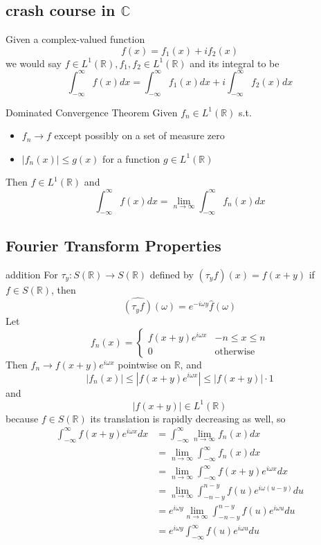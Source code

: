 \documentclass[a4paper]{article}
\newcommand{\C}{\mathbb{C}}
\newcommand{\R}{\mathbb{R}}
\begin{document}
\subsection{crash course in $\C$}

Given a complex-valued function \[
	f(x) = f_1(x) + i f_2(x)
\] we would say $f \in L^1(\R), f_1,f_2 \in L^1(\R)$ and its integral to be \[
\int_{-\infty}^{\infty} f(x) dx = \int_{-\infty}^{\infty} f_1(x)dx + i \int_{-\infty}^{\infty} f_2(x) dx
\] 

\begin{Theorem}{Dominated Convergence Theorem}{}
	Given $f_n \in L^1(\R)$ s.t. \begin{itemize}
		\item $f_n \to f$ except possibly on a set of measure zero
		\item $\left| f_n(x) \right| \le g(x) $ for a function $g \in L^1(\R)$
	\end{itemize}
	Then $f\in L^1(\R)$ and \[
		\int_{-\infty}^{\infty} f(x) dx = \lim_{n \to \infty}  \int_{-\infty}^{\infty} f_n(x) dx
	\] 	
\end{Theorem}

\subsection{Fourier Transform Properties}

\begin{Corollary}{addition}{}
	For $\tau_y: S(\R) \to S(\R)$ defined by $(\tau_y f)(x) = f(x+y)$ if  $f\in S(\R)$, then \[
	\widehat{\left(\tau_{y} f\right)}(\omega)=e^{-i \omega y} \hat{f}(\omega)
	\] 
	\tcblower
	Let \[
		f_n(x) = \begin{cases}
			f(x+y) e^{i \omega x} & -n \le  x \le n \\
			0 & \text{otherwise}
		\end{cases}
	\] Then $f_n \to  f(x+y) e^{i \omega x}$ pointwise on $\R$, and  \[
	\left| f_n(x) \right| \le  \left| f(x+y) e^{i \omega x} \right| \le  \left| f(x+y) \right| \cdot 1 
\] and \[
\left| f(x+y) \right| \in  L^1(\R)
\] because $f \in  S(\R)$ its translation is rapidly decreasing as well, so
\begin{align*}
	\int_{-\infty}^{\infty} f(x+y) e^{i \omega x} dx &= \int_{-\infty}^{\infty} \lim_{n \to \infty} f_n(x) dx \\
							  &= \lim_{n \to \infty} \int_{-\infty}^{\infty}  f_n(x) dx \\
							  &= \lim_{n \to \infty}  \int_{-\infty}^{\infty}  f(x+y) e^{i \omega x} dx \\
							  &= \lim_{n \to \infty} \int_{-n-y}^{n-y} f(u) e^{i \omega (u-y)} du \\
							  &= e^{i \omega y} \lim_{n \to \infty} \int_{-n-y}^{n-y} f(u) e^{i \omega u} du \\
							  &= e^{i \omega y} \int_{-\infty}^{\infty} f(u) e^{i \omega u} du
\end{align*}
\end{Corollary}
\end{document}
